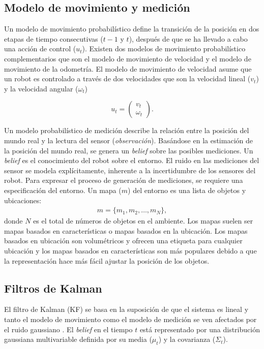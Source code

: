 \subsection{Modelo de movimiento y medici\'on}

Un modelo de movimiento probabil\'istico define la transici\'on de la posici\'on 
en dos etapas de tiempo consecutivas ($t-1$ y $t$), despu\'es de que se ha llevado 
a cabo una acci\'on de control ($u_{t}$). Existen dos modelos de movimiento 
probabil\'istico complementarios que son el modelo de movimiento de velocidad y 
el modelo de movimiento de la odometr\'ia. El modelo de movimiento de velocidad 
asume que un robot es controlado a trav\'es de dos velocidades que son la 
velocidad lineal ($v_{t}$) y la velocidad angular ($\omega_{t}$)

\begin{equation}
\label{eqn:modelMotion}
u_{t} = \begin{pmatrix}
v_{t} \\
\omega_{t}
\end{pmatrix}.
\end{equation}

Un modelo probabilístico de medición describe la relación entre la posición 
del mundo real y la lectura del sensor (\textit{observación}). Basándose en la 
estimación de la posición del mundo real, se genera un \textit{belief} sobre 
las posibles mediciones. Un \textit{belief} es el conocimiento del robot sobre el 
entorno. El ruido en las mediciones del sensor se modela explícitamente, inherente 
a la incertidumbre de los sensores del robot. Para expresar el proceso de 
generación de mediciones, se requiere una especificación del entorno. Un mapa 
($m$) del entorno es una lista de objetos y ubicaciones:
\begin{align}
m =\{m_{1}, m_{2}, \ldots, m_{N}\},
\end{align}
donde $N$ es el total de n\'umeros de objetos en el ambiente. Los mapas suelen 
ser mapas basados en caracter\'isticas o mapas basados en la ubicaci\'on. Los 
mapas basados en ubicación son volumétricos y ofrecen una etiqueta para cualquier 
ubicación y los mapas basados en características son más populares debido a que 
la representación hace más fácil ajustar la posición de los objetos.

\subsection{Filtros de Kalman}
El filtro de Kalman (KF) se basa en la suposición de que el sistema es lineal y tanto 
el modelo de movimiento como el modelo de medición se ven afectados por el ruido 
gaussiano \cite{jetto1999development}. El \textit{belief} en el tiempo $t$ está 
representado por una distribución gaussiana multivariable definida por su media 
($\mu_{t}$) y la covarianza ($\Sigma_{t}$).

